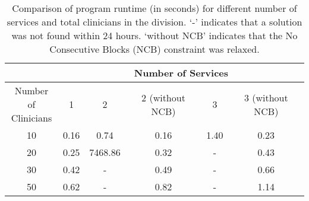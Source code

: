 \begin{table}[htbp]
	\centering
	\begin{tabular}{|c|c||c|c||c|c|}
		\hline
		                                      &  \multicolumn{5}{c|}{Number of Services}  \\ \hline
		\makecell[l]{Number of \\ Clinicians} &  1   &    2    & 2 (without NCB) &  3   & 3 (without NCB) \\ \hline
		                 10                   & 0.16 &  0.74   &  0.16   & 1.40 &  0.23   \\ \hline
		                 20                   & 0.25 & 7468.86 &  0.32   &  -   &  0.43   \\ \hline
		                 30                   & 0.42 &    -    &  0.49   &  -   &  0.66   \\ \hline
		                 50                   & 0.62 &    -    &  0.82   &  -   &  1.14   \\ \hline
	\end{tabular}
	\caption{Comparison of program runtime (in seconds) for different number of services and total clinicians in the division. `-' indicates that a solution was not found within 24 hours. `without NCB' indicates that the No Consecutive Blocks (NCB) constraint was relaxed.}\label{tbl:runtime-services-clinicians-comparison}%
\end{table}